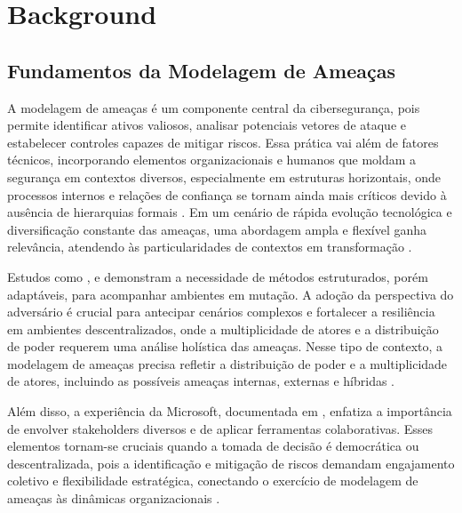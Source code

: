 
%

\chapter{Background}
\label{cha:background}

\glsresetall

\section{Fundamentos da Modelagem de Ameaças}
\label{sec:fundamentos_da_modelagem_de_ameacas}

A modelagem de ameaças é um componente central da cibersegurança, pois
permite identificar ativos valiosos, analisar potenciais vetores de
ataque e estabelecer controles capazes de mitigar riscos. Essa prática
vai além de fatores técnicos, incorporando elementos organizacionais e
humanos que moldam a segurança em contextos diversos, especialmente em
estruturas horizontais, onde processos internos e relações de confiança
se tornam ainda mais críticos devido à ausência de hierarquias formais \cite{Colbac}.
Em um cenário de rápida evolução tecnológica e diversificação constante
das ameaças, uma abordagem ampla e flexível ganha relevância, atendendo
às particularidades de contextos em transformação \cite{ThreatModelingdesigningForSecurity}.

Estudos como \cite{ThreatModelingAsABasisForSecurityRequirements},
\cite{AdvancedThreatModeling} e
\cite{DemystifyingTheThreatModelingProcess} demonstram a necessidade
de métodos estruturados, porém adaptáveis, para acompanhar ambientes
em mutação. A adoção da perspectiva do adversário \cite{AHybridThreatModelingMethod}
é crucial para antecipar cenários complexos e fortalecer a resiliência
em ambientes descentralizados, onde a multiplicidade de atores e a
distribuição de poder requerem uma análise holística das ameaças.
Nesse tipo de contexto, a modelagem de ameaças precisa refletir
a distribuição de poder e a multiplicidade de atores, incluindo as
possíveis ameaças internas, externas e híbridas \cite{ThreatModelingASummaryOfAvailableMethods}.

Além disso, a experiência da Microsoft, documentada em
\cite{ExperiencesThreatModelingAtMicrosoft}, enfatiza a importância de
envolver stakeholders diversos e de aplicar ferramentas colaborativas.
Esses elementos tornam-se cruciais quando a tomada de decisão é
democrática ou descentralizada, pois a identificação e mitigação de
riscos demandam engajamento coletivo e flexibilidade estratégica,
conectando o exercício de modelagem de ameaças às dinâmicas
organizacionais \cite{ParticipatoryThreatModelling}.

